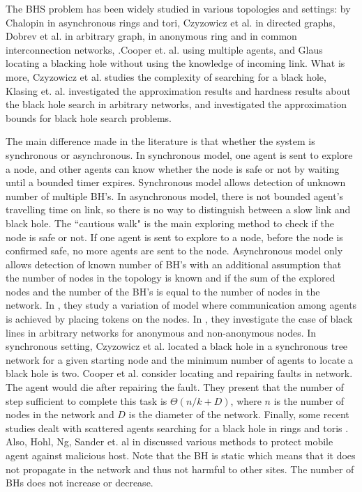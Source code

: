 The BHS problem has been widely studied in various topologies and settings: 
by Chalopin \cite{das1,das2} in asynchronous rings and tori, Czyzowicz et al. \cite{czyz} in directed graphs, Dobrev et al. \cite{ dobr} in arbitrary graph, \cite{dobr3} in anonymous ring and \cite{dobr2} in common interconnection networks, .Cooper et. al. \cite{coop} using multiple agents, and Glaus \cite{glau} locating a blacking hole without using the knowledge of incoming link. What is more, Czyzowicz et al. \cite{czyz1} studies the complexity of searching for a black hole, Klasing et. al. \cite{klas} investigated the approximation results and hardness results about the black hole search in arbitrary networks, and \cite{klas1}investigated the approximation bounds for black hole search problems.  

The main difference made in the literature is that whether the system is synchronous or asynchronous. In synchronous model, one agent is sent to explore a node, and other agents can know whether the node is safe or not by waiting until a bounded timer expires. Synchronous model allows detection of unknown number of multiple BH's. In asynchronous model, there is not bounded agent's travelling time on link, so there is no way to distinguish between a slow link and black hole. The ``cautious walk" is the main exploring method to check if the node is safe or not. If one agent is sent to explore to a node, before the node is confirmed safe, no more agents are sent to the node. Asynchronous model only allows detection of known number of BH's with an additional assumption that the number of nodes in the topology is known and if the sum of the explored nodes and the number of the BH's is equal to the number of nodes in the network. In \cite{dobr,dobr1,shi}, they study a variation of model where communication among agents is achieved by placing tokens on the nodes. In \cite{chal2, floc}, they investigate the case of black lines in arbitrary networks for anonymous and non-anonymous nodes. In synchronous setting, Czyzowicz et al.\cite{Czyz2} located a black hole in a synchronous tree network for a given starting node and the minimum number of agents to locate a black hole is two. Cooper et al.\cite{coop1} consider locating  and repairing faults in network. The agent would die after repairing the fault. They present that the number of step sufficient to complete this task is $\Theta(n/k+D)$, where $n$ is the number of nodes in the network and $D$ is the diameter of the network. Finally, some recent studies dealt with scattered agents searching for a black hole in rings and toris \cite{chal,chal1,}. Also, Hohl, Ng, Sander et. al in \cite{ng, hohl1, hohl2, rubi} discussed various methods to protect mobile agent against malicious host. Note that the BH is static which means that it does not propagate in the network and thus not harmful to other sites. The number of BHs does not increase or decrease. 


